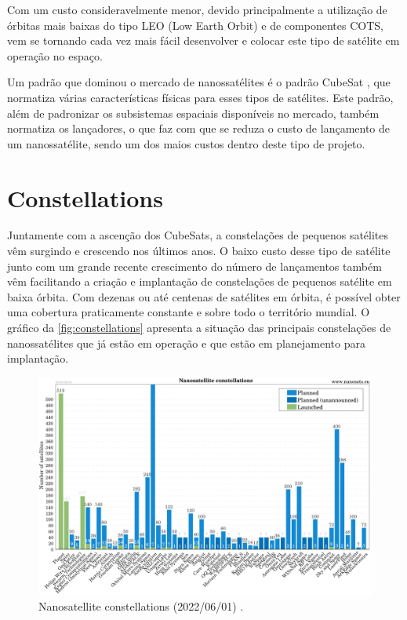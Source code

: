 Com um custo consideravelmente menor, devido principalmente a utilização de órbitas mais baixas do tipo LEO (Low Earth Orbit) e de componentes COTS, vem se tornando cada vez mais fácil desenvolver e colocar este tipo de satélite em operação no espaço.

Um padrão que dominou o mercado de nanossatélites é o padrão CubeSat \cite{cds}, que normatiza várias características físicas para esses tipos de satélites. Este padrão, além de padronizar os subsistemas espaciais disponíveis no mercado, também normatiza os lançadores, o que faz com que se reduza o custo de lançamento de um nanossatélite, sendo um dos maios custos dentro deste tipo de projeto.

\section{Constellations}

Juntamente com a ascenção dos CubeSats, a constelações de pequenos satélites vêm surgindo e crescendo nos últimos anos. O baixo custo desse tipo de satélite junto com um grande recente crescimento do número de lançamentos também vêm facilitando a criação e implantação de constelações de pequenos satélite em baixa órbita. Com dezenas ou até centenas de satélites em órbita, é possível obter uma cobertura praticamente constante e sobre todo o território mundial. O gráfico da \autoref{fig:constellations} apresenta a situação das principais constelações de nanossatélites que já estão em operação e que estão em planejamento para implantação.

\begin{figure}[!ht]
    \begin{center}
        \includegraphics[width=\columnwidth]{figures/Nanosats_constellations_2022-06-01}
        \caption{Nanosatellite constellations (2022/06/01) \cite{nanosatseu}.}
        \label{fig:constellations}
    \end{center}
\end{figure}

